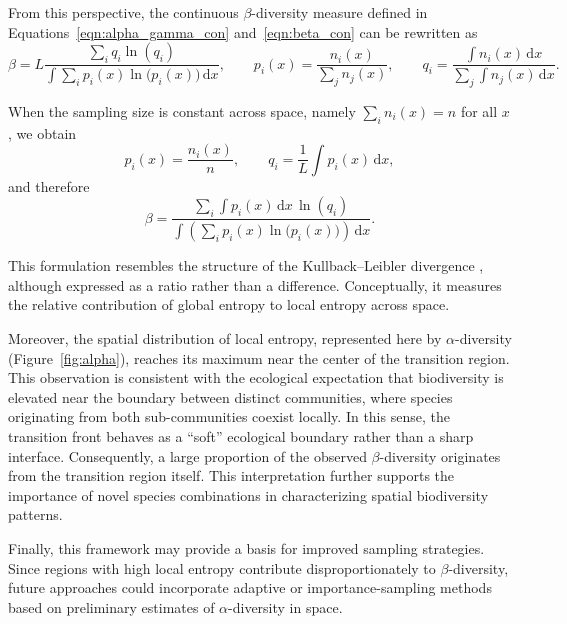 From this perspective, the continuous $\beta$-diversity measure defined in Equations~\ref{eqn:alpha_gamma_con} and~\ref{eqn:beta_con} can be rewritten as
\begin{equation*}
    \beta 
    = 
    L 
    \frac{
        \sum_i q_i \ln(q_i)
    }{
        \int \sum_i p_i(x) \ln\big(p_i(x)\big)\,\mathrm{d}x
    },
    \qquad
    p_i(x) = \frac{n_i(x)}{\sum_{j} n_j(x)},
    \qquad
    q_i = \frac{\int n_i(x)\,\mathrm{d}x}{\sum_{j} \int n_j(x)\,\mathrm{d}x}.
\end{equation*}

When the sampling size is constant across space, namely $\sum_i n_i(x)=n$ for all $x$, we obtain
\begin{equation*}
    p_i(x)=\frac{n_i(x)}{n},
    \qquad
    q_i=\frac{1}{L}\int p_i(x)\,\mathrm{d}x,
\end{equation*}
and therefore
\begin{equation}
    \beta
    =
    \frac{
        \sum_i \int p_i(x)\,\mathrm{d}x \, \ln(q_i)
    }{
        \int \left(
            \sum_i p_i(x)\ln\big(p_i(x)\big)
        \right)\,\mathrm{d}x
    }.
\end{equation}

This formulation resembles the structure of the Kullback--Leibler divergence \citep{kullback_information_1951}, although expressed as a ratio rather than a difference. Conceptually, it measures the relative contribution of global entropy to local entropy across space.

Moreover, the spatial distribution of local entropy, represented here by $\alpha$-diversity (Figure~\ref{fig:alpha}), reaches its maximum near the center of the transition region. This observation is consistent with the ecological expectation that biodiversity is elevated near the boundary between distinct communities, where species originating from both sub-communities coexist locally. In this sense, the transition front behaves as a ``soft'' ecological boundary rather than a sharp interface. Consequently, a large proportion of the observed $\beta$-diversity originates from the transition region itself. This interpretation further supports the importance of novel species combinations in characterizing spatial biodiversity patterns.

Finally, this framework may provide a basis for improved sampling strategies. Since regions with high local entropy contribute disproportionately to $\beta$-diversity, future approaches could incorporate adaptive or importance-sampling methods based on preliminary estimates of $\alpha$-diversity in space.